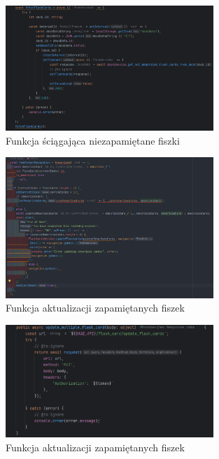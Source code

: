 \begin{figure}[H]
    \centering
    \includegraphics[width=0.7\textwidth]{chapters/chapter_8/screens/get_unmemorized_flash_cards_web}
    \caption{Funkcja ściągająca niezapamiętane fiszki}
    \label{img:get_unmemorized_flash_cards_web}
\end{figure}

\begin{figure}[H]
    \centering
    \includegraphics[width=0.7\textwidth]{chapters/chapter_8/screens/pass_unmemorized_flash_cards_web}
    \caption{Funkcja aktualizacji zapamiętanych fiszek}
    \label{img:pass_unmemorized_flash_cards_web}
\end{figure}

\begin{figure}[H]
    \centering
    \includegraphics[width=0.7\textwidth]{chapters/chapter_8/screens/update_unmemorized_flash_cards_web}
    \caption{Funkcja aktualizacji zapamiętanych fiszek}
    \label{img:update_unmemorized_flash_cards_web}
\end{figure}